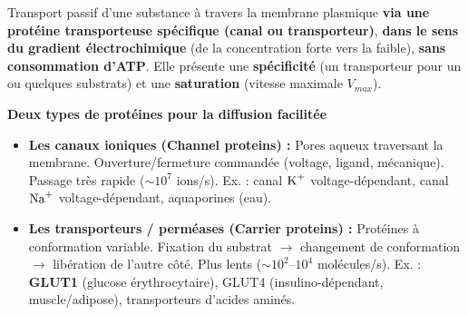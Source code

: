 \documentclass[11pt]{article}
\newcommand{\cle}[1]{{\popxbold\color{popdark}#1}}
\begin{document}
\begin{definition}
Transport passif d'une substance à travers la membrane plasmique \textbf{via une protéine transporteuse spécifique (canal ou transporteur)}, \textbf{dans le sens du gradient électrochimique} (de la concentration forte vers la faible), \textbf{sans consommation d'ATP}. Elle présente une \textbf{spécificité} (un transporteur pour un ou quelques substrats) et une \textbf{saturation} (vitesse maximale $V_{max}$).
\end{definition}

\textbf{Deux types de protéines pour la diffusion facilitée}\par

\begin{itemize}
    \item \textbf{Les canaux ioniques (\cle{Channel proteins}) :} Pores aqueux traversant la membrane. Ouverture/fermeture commandée (voltage, ligand, mécanique). Passage très rapide ($\sim 10^7$ ions/s). Ex. : canal $\ce{K+}$ voltage-dépendant, canal $\ce{Na+}$ voltage-dépendant, \cle{aquaporines} (eau).
    \item \textbf{Les transporteurs / perméases (\cle{Carrier proteins}) :} Protéines à conformation variable. Fixation du substrat $\rightarrow$ changement de conformation $\rightarrow$ libération de l'autre côté. Plus lents ($\sim 10^2$--$10^4$ molécules/s). Ex. : \textbf{GLUT1} (glucose érythrocytaire), GLUT4 (insulino-dépendant, muscle/adipose), transporteurs d'acides aminés.
\end{itemize}
\end{document}
